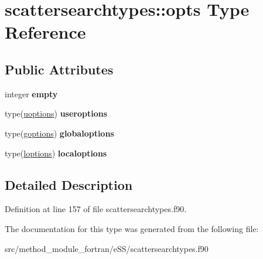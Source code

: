 \hypertarget{structscattersearchtypes_1_1opts}{\section{scattersearchtypes\-:\-:opts Type Reference}
\label{structscattersearchtypes_1_1opts}
}
\subsection*{Public Attributes}
\begin{DoxyCompactItemize}
\item 
\hypertarget{structscattersearchtypes_1_1opts_a3ed15c8e04afcd8b182304c84bb8c76f}{integer {\bfseries empty}}\label{structscattersearchtypes_1_1opts_a3ed15c8e04afcd8b182304c84bb8c76f}

\item 
\hypertarget{structscattersearchtypes_1_1opts_abcbb32dc2dd7c2e4870a0a0a0fd645e1}{type(\hyperlink{structscattersearchtypes_1_1uoptions}{uoptions}) {\bfseries useroptions}}\label{structscattersearchtypes_1_1opts_abcbb32dc2dd7c2e4870a0a0a0fd645e1}

\item 
\hypertarget{structscattersearchtypes_1_1opts_a5aa9b4066a6de3027c9d44fa4408ad4a}{type(\hyperlink{structscattersearchtypes_1_1goptions}{goptions}) {\bfseries globaloptions}}\label{structscattersearchtypes_1_1opts_a5aa9b4066a6de3027c9d44fa4408ad4a}

\item 
\hypertarget{structscattersearchtypes_1_1opts_a4c7b2eaa8e9be8d87858b87c7ce8fca8}{type(\hyperlink{structscattersearchtypes_1_1loptions}{loptions}) {\bfseries localoptions}}\label{structscattersearchtypes_1_1opts_a4c7b2eaa8e9be8d87858b87c7ce8fca8}

\end{DoxyCompactItemize}


\subsection{Detailed Description}


Definition at line 157 of file scattersearchtypes.\-f90.



The documentation for this type was generated from the following file\-:\begin{DoxyCompactItemize}
\item 
src/method\-\_\-module\-\_\-fortran/e\-S\-S/scattersearchtypes.\-f90\end{DoxyCompactItemize}
